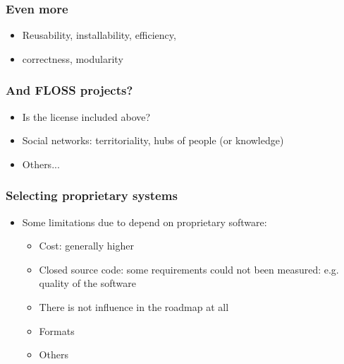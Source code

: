 
\begin{frame}
\frametitle{Even more}

\begin{itemize}
\item Reusability, installability, efficiency,
\item correctness, modularity
\end{itemize}
\end{frame}


\begin{frame}
\frametitle{And FLOSS projects?}

\begin{itemize}
\item Is the license included above?
\item Social networks: territoriality, hubs of people (or knowledge)
\item Others...
\end{itemize}
\end{frame}


\begin{frame}
\frametitle{Selecting proprietary systems}

\begin{itemize}
\item Some limitations due to depend on proprietary software:
 \begin{itemize}
  \item Cost: generally higher
  \item Closed source code: some requirements could not been measured: e.g. quality of the software
  \item There is not influence in the roadmap at all
  \item Formats
  \item Others
 \end{itemize}
\end{itemize}
\end{frame}


